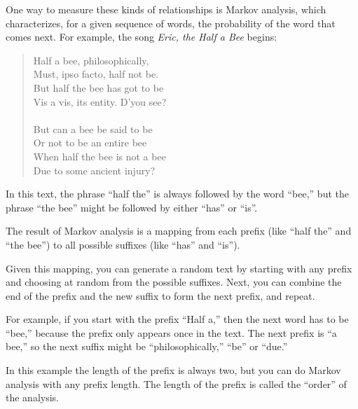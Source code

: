 \documentclass[10pt]{book}
\begin{document}
One way to measure these kinds of relationships is Markov
analysis, which
characterizes, for a given sequence of words, the probability of the
word that comes next.  For example, the song {\em Eric, the Half a
  Bee} begins:

\begin{quote}
Half a bee, philosophically, \\
Must, ipso facto, half not be. \\
But half the bee has got to be \\
Vis a vis, its entity. D'you see? \\
\\
But can a bee be said to be \\
Or not to be an entire bee \\
When half the bee is not a bee \\
Due to some ancient injury? \\
\end{quote}
%
In this text,
the phrase ``half the'' is always followed by the word ``bee,''
but the phrase ``the bee'' might be followed by either
``has'' or ``is''.

The result of Markov analysis is a mapping from each prefix
(like ``half the'' and ``the bee'') to all possible suffixes
(like ``has'' and ``is'').

Given this mapping, you can generate a random text by
starting with any prefix and choosing at random from the
possible suffixes.  Next, you can combine the end of the
prefix and the new suffix to form the next prefix, and repeat.

For example, if you start with the prefix ``Half a,'' then the
next word has to be ``bee,'' because the prefix only appears
once in the text.  The next prefix is ``a bee,'' so the
next suffix might be ``philosophically,'' ``be'' or ``due.''

In this example the length of the prefix is always two, but
you can do Markov analysis with any prefix length.  The length
of the prefix is called the ``order'' of the analysis.
\end{document}
